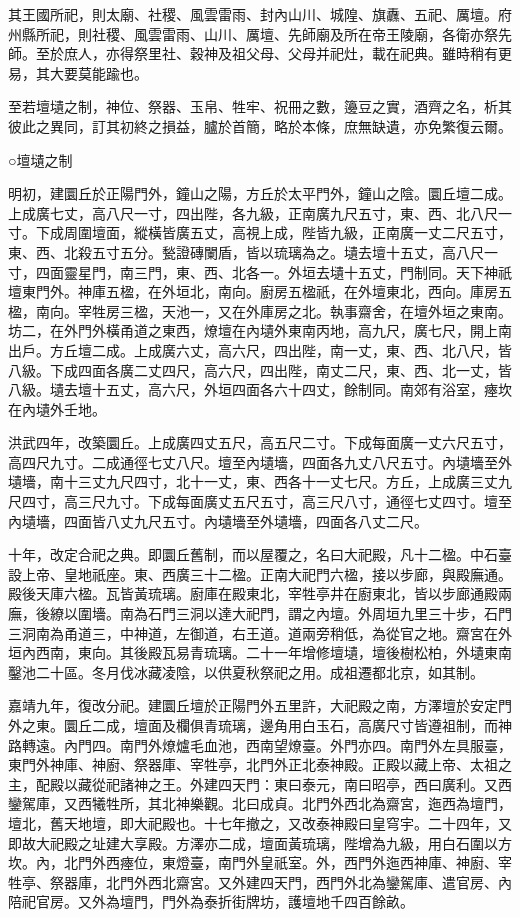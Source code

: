 其王國所祀，則太廟、社稷、風雲雷雨、封內山川、城隍、旗纛、五祀、厲壇。府州縣所祀，則社稷、風雲雷雨、山川、厲壇、先師廟及所在帝王陵廟，各衛亦祭先師。至於庶人，亦得祭里社、穀神及祖父母、父母并祀灶，載在祀典。雖時稍有更易，其大要莫能踰也。

至若壇壝之制，神位、祭器、玉帛、牲牢、祝冊之數，籩豆之實，酒齊之名，析其彼此之異同，訂其初終之損益，臚於首簡，略於本條，庶無缺遺，亦免繁復云爾。

○壇壝之制

明初，建圜丘於正陽門外，鐘山之陽，方丘於太平門外，鐘山之陰。圜丘壇二成。上成廣七丈，高八尺一寸，四出陛，各九級，正南廣九尺五寸，東、西、北八尺一寸。下成周圍壇面，縱橫皆廣五丈，高視上成，陛皆九級，正南廣一丈二尺五寸，東、西、北殺五寸五分。甃證磚闌盾，皆以琉璃為之。壝去壇十五丈，高八尺一寸，四面靈星門，南三門，東、西、北各一。外垣去壝十五丈，門制同。天下神祇壇東門外。神庫五楹，在外垣北，南向。廚房五楹祇，在外壇東北，西向。庫房五楹，南向。宰牲房三楹，天池一，又在外庫房之北。執事齋舍，在壇外垣之東南。坊二，在外門外橫甬道之東西，燎壇在內壝外東南丙地，高九尺，廣七尺，開上南出戶。方丘壇二成。上成廣六丈，高六尺，四出陛，南一丈，東、西、北八尺，皆八級。下成四面各廣二丈四尺，高六尺，四出陛，南丈二尺，東、西、北一丈，皆八級。壝去壇十五丈，高六尺，外垣四面各六十四丈，餘制同。南郊有浴室，瘞坎在內壝外壬地。

洪武四年，改築圜丘。上成廣四丈五尺，高五尺二寸。下成每面廣一丈六尺五寸，高四尺九寸。二成通徑七丈八尺。壇至內壝墻，四面各九丈八尺五寸。內壝墻至外壝墻，南十三丈九尺四寸，北十一丈，東、西各十一丈七尺。方丘，上成廣三丈九尺四寸，高三尺九寸。下成每面廣丈五尺五寸，高三尺八寸，通徑七丈四寸。壇至內壝墻，四面皆八丈九尺五寸。內壝墻至外壝墻，四面各八丈二尺。

十年，改定合祀之典。即圜丘舊制，而以屋覆之，名曰大祀殿，凡十二楹。中石臺設上帝、皇地祇座。東、西廣三十二楹。正南大祀門六楹，接以步廊，與殿廡通。殿後天庫六楹。瓦皆黃琉璃。廚庫在殿東北，宰牲亭井在廚東北，皆以步廊通殿兩廡，後繚以圍墻。南為石門三洞以達大祀門，謂之內壇。外周垣九里三十步，石門三洞南為甬道三，中神道，左御道，右王道。道兩旁稍低，為從官之地。齋宮在外垣內西南，東向。其後殿瓦易青琉璃。二十一年增修壇壝，壇後樹松柏，外壝東南鑿池二十區。冬月伐冰藏凌陰，以供夏秋祭祀之用。成祖遷都北京，如其制。

嘉靖九年，復改分祀。建圜丘壇於正陽門外五里許，大祀殿之南，方澤壇於安定門外之東。圜丘二成，壇面及欄俱青琉璃，邊角用白玉石，高廣尺寸皆遵祖制，而神路轉遠。內門四。南門外燎爐毛血池，西南望燎臺。外門亦四。南門外左具服臺，東門外神庫、神廚、祭器庫、宰牲亭，北門外正北泰神殿。正殿以藏上帝、太祖之主，配殿以藏從祀諸神之王。外建四天門：東曰泰元，南曰昭亭，西曰廣利。又西鑾駕庫，又西犧牲所，其北神樂觀。北曰成貞。北門外西北為齋宮，迤西為壇門，壇北，舊天地壇，即大祀殿也。十七年撤之，又改泰神殿曰皇穹宇。二十四年，又即故大祀殿之址建大享殿。方澤亦二成，壇面黃琉璃，陛增為九級，用白石圍以方坎。內，北門外西瘞位，東燈臺，南門外皇祇室。外，西門外迤西神庫、神廚、宰牲亭、祭器庫，北門外西北齋宮。又外建四天門，西門外北為鑾駕庫、遣官房、內陪祀官房。又外為壇門，門外為泰折街牌坊，護壇地千四百餘畝。

